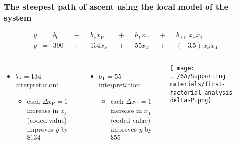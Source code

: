 \begin{frame}\frametitle{The steepest {\color{myOrange}path of ascent} using the local model of the system}

	\begin{exampleblock}{}
		\begin{align*} 
			y &=& b_0 &&+&& b_\text{P} x_\text{P} &&+&& b_\text{T} x_\text{T} &&+&& b_\text{PT}\,\,x_\text{P}x_\text{T} \\
			y &=& 390 &&+&& 134 x_\text{P}        &&+&& 55 x_\text{T}         &&+&& (-3.5)\,x_\text{P}x_\text{T} 
		\end{align*}		
	\end{exampleblock}
	
	\begin{columns}[c]
			\begin{itemize}
				\item	$b_\text{P} =134$ interpretation:
				\begin{itemize}
					\item	each $\Delta x_\text{P} = 1$ increase in $x_\text{P}$ (coded value) improves $y$ by $\$134$
				\end{itemize}
			\end{itemize}
			\pause
			\begin{itemize}
				\item	$b_\text{T} = 55$ interpretation:
				\begin{itemize}
					\item	each $\Delta x_\text{T} = 1$ increase in $x_\text{T}$ (coded value)  improves $y$ by $\$55$
				\end{itemize}
			\end{itemize}
			\centerline{\texttt{[image: ../6A/Supporting materials/first-factorial-analysis-delta-P.png]}}
	\end{columns}
\end{frame}

